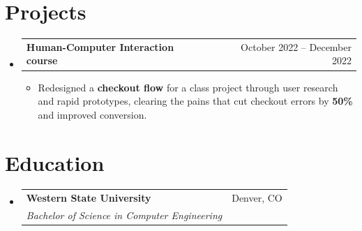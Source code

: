\documentclass[letterpaper,10.9pt]{article}
\makeatletter
\newcommand{\resumeItem}[1]{
  \item\small{
    {#1 \vspace{-2pt}}
  }
}
\newcommand{\resumeSubheading}[4]{
  \vspace{-2pt}\item
    \begin{tabular*}{0.97\textwidth}[t]{l@{\extracolsep{\fill}}r}
      \textbf{#1} & #2 \\
      \textit{\small#3} & \textit{\small #4} \\
    \end{tabular*}\vspace{-7pt}
}
\newcommand{\resumeProjectHeading}[2]{
    \item
    \begin{tabular*}{0.97\textwidth}{l@{\extracolsep{\fill}}r}
      \small#1 & #2 \\
    \end{tabular*}\vspace{-7pt}
}
\newcommand{\resumeSubHeadingListStart}{\begin{itemize}[leftmargin=0.15in, label={}]}
\newcommand{\resumeSubHeadingListEnd}{\end{itemize}}
\newcommand{\resumeItemListStart}{\begin{itemize}}
\newcommand{\resumeItemListEnd}{\end{itemize}\vspace{-5pt}}
\makeatother
\begin{document}
\section{Projects}
    \resumeSubHeadingListStart
      \resumeProjectHeading
          {\textbf{Human-Computer Interaction course}}{October 2022 -- December 2022}
          \resumeItemListStart
            \resumeItem{Redesigned a \textbf{checkout flow} for a class project through user research and rapid prototypes, clearing the pains that cut checkout errors by \textbf{50\%} and improved conversion.}
          \resumeItemListEnd
  \resumeSubHeadingListEnd

\section{Education}
  \resumeSubHeadingListStart
    \resumeSubheading
      {Western State University}{Denver, CO}
      {Bachelor of Science in Computer Engineering}{}
  \resumeSubHeadingListEnd
\end{document}
